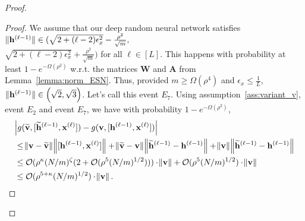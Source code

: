 \begin{proof}
\begin{proof}
		
		We assume that our deep random neural network satisfies $\norm[0]{\mathbf{h}^{(\ell-1)}} \in (\sqrt{2 + (\ell - 2)\epsilon_x^2} - \frac{\rho^2}{\sqrt{m}},$\\$ \sqrt{2 + (\ell - 2)\epsilon_x^2} + 
		\frac{\rho^2}{\sqrt{m}})$ for all $\ell \in [L]$. This happens with probability at least $1-e^{-\Omega(\rho^2)}$ w.r.t. the matrices $\mathbf{W}$ and $\mathbf{A}$ from Lemma~\ref{lemma:norm_ESN}. Thus, provided $m \ge \Omega(\rho^4)$ and $\epsilon_x \le \frac{1}{L}$, $\norm[0]{\mathbf{h}^{(\ell-1)}} \in \left(\sqrt{2}, \sqrt{3}\right)$. Let's call this event $E_7$.
		Using assumption~\ref{ass:variant_v}, event $E_2$ and event $E_7$, we have with probability $1-e^{-\Omega(\rho^2)}$,
		\begin{align*}
			&\abs{g(\widetilde{\mathbf{v}}, [\widetilde{\mathbf{h}}^{(\ell-1)},  \mathbf{x}^{(\ell)}]) - g(\mathbf{v}, [\mathbf{h}^{(\ell-1)},  \mathbf{x}^{(\ell)}])}\\ &\le 
			\norm{\mathbf{v} - \widetilde{\mathbf{v}}} \norm{[\mathbf{h}^{(\ell-1)},  \mathbf{x}^{(\ell)}]} + \norm{\widetilde{\mathbf{v}} - \mathbf{v}} \norm{\widetilde{\mathbf{h}}^{(\ell-1)} - \mathbf{h}^{(\ell-1)}} + \norm{\mathbf{v}}\norm{\widetilde{\mathbf{h}}^{(\ell-1)} - \mathbf{h}^{(\ell-1)}} \\&
			\le \mathcal{O}(\rho^\kappa (N/m)^{\zeta} (2 + \mathcal{O}(\rho^5 (N/m)^{1/2}))) \cdot \norm{\mathbf{v}} + \mathcal{O}(\rho^5 (N/m)^{1/2}) \cdot \norm{\mathbf{v}} \\&
			\le \mathcal{O}(\rho^{5 + \kappa} (N/m)^{1/2}) \cdot \norm{\mathbf{v}}.
		\end{align*}
	\end{proof}
	

\end{proof}
